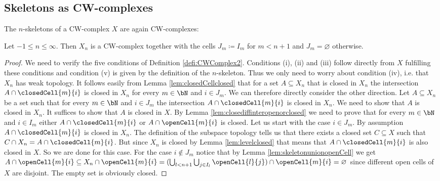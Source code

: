 \subsection{Skeletons as CW-complexes}

The $n$-skeletons of a CW-complex $X$ are again CW-complexes: 

\begin{lem} \label{lem:levelcwcomplex}
    Let $-1 \le n \le \infty$. 
    Then $X_n$ is a CW-complex together with the cells $J_m \coloneq I_m$ for $m < n + 1$ and $J_m = \varnothing$ otherwise.
\end{lem}
\begin{proof}
    We need to verify the five conditions of Definition \ref{defi:CWComplex2}.
    Conditions (i), (ii) and (iii) follow directly from $X$ fulfilling these conditions and condition (v) is given by the definition of the $n$-skeleton. 
    Thus we only need to worry about condition (iv), i.e. that $X_n$ has weak topology. 
    It follows easily from Lemma \ref{lem:closedCellclosed} that for a set $A \subseteq X_n$ that is closed in $X_n$ the intersection $A \cap \closedCell{m}{i}$ is closed in $X_n$ for every $m \in \bN$ and $i \in J_m$. 
    We can therefore directly consider the other direction. 
    Let $A \subseteq X_n$ be a set such that for every $m \in \bN$ and $i \in J_m$ the intersection $A \cap \closedCell{m}{i}$ is closed in $X_n$. 
    We need to show that $A$ is closed in $X_n$. 
    It suffices to show that $A$ is closed in $X$. 
    By Lemma \ref{lem:closediffinteropenorclosed} we need to prove that for every $m \in \bN$ and $i \in I_m$ either $A \cap \closedCell{m}{i}$ or $A \cap \openCell{m}{i}$ is closed. 
    Let us start with the case $i \in J_m$. 
    By assumption $A \cap \closedCell{m}{i}$ is closed in $X_n$. 
    The definition of the subspace topology tells us that there exists a closed set $C \subseteq X$ such that $C \cap X_n = A \cap \closedCell{m}{i}$. 
    But since $X_n$ is closed by Lemma \ref{lem:levelclosed} that means that $A \cap \closedCell{m}{i}$ is also closed in $X$. 
    So we are done for this case. 
    For the case $i \notin J_m$ notice that by Lemma \ref{lem:skeletonunionopenCell} we get $A \cap \openCell{m}{i} \subseteq X_n \cap \openCell{m}{i} = (\bigcup_{l < n + 1}\bigcup_{j \in I_l}\openCell{l}{j}) \cap \openCell{m}{i} = \varnothing$ since different open cells of $X$ are disjoint. 
    The empty set is obviously closed.
\end{proof}